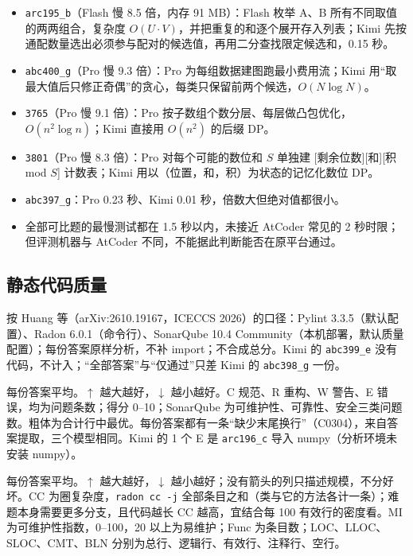 \documentclass[11pt,a4paper,fontset=none]{ctexart}
\begin{document}
\begin{itemize}
  \item \texttt{arc195\_b}（Flash 慢 8.5 倍，内存 91 MB）：Flash 枚举 A、B 所有不同取值的两两组合，复杂度 $O(U\cdot V)$，并把重复的和逐个展开存入列表；Kimi 先按通配数量选出必须参与配对的候选值，再用二分查找限定候选和，0.15 秒。
  \item \texttt{abc400\_g}（Pro 慢 9.3 倍）：Pro 为每组数据建图跑最小费用流；Kimi 用“取最大值后只修正奇偶”的贪心，每类只保留前两个候选，$O(N\log N)$。
  \item \texttt{3765}（Pro 慢 9.1 倍）：Pro 按子数组个数分层、每层做凸包优化，$O(n^2\log n)$；Kimi 直接用 $O(n^2)$ 的后缀 DP。
  \item \texttt{3801}（Pro 慢 8.3 倍）：Pro 对每个可能的数位和 $S$ 单独建 [剩余位数][和][积 mod $S$] 计数表；Kimi 用以（位置，和，积）为状态的记忆化数位 DP。
  \item \texttt{abc397\_g}：Pro 0.23 秒、Kimi 0.01 秒，倍数大但绝对值都很小。
  \item 全部可比题的最慢测试都在 1.5 秒以内，未接近 AtCoder 常见的 2 秒时限；但评测机器与 AtCoder 不同，不能据此判断能否在原平台通过。
\end{itemize}

\subsection{静态代码质量}\label{sec:static}
按 Huang 等（arXiv:2610.19167，ICECCS 2026）的口径：Pylint 3.3.5（默认配置）、Radon 6.0.1（命令行）\ifnum{}、SonarQube 10.4 Community（本机部署，默认质量配置）\fi；每份答案原样分析，不补 import；不合成总分。Kimi 的 \texttt{abc399\_e} 没有代码，不计入；“全部答案”与“仅通过”只差 Kimi 的 \texttt{abc398\_g} 一份。

\begin{center}
\footnotesize
\setlength{\tabcolsep}{3.5pt}
\QualIssueTable
\end{center}
{\footnotesize 每份答案平均。$\uparrow$ 越大越好，$\downarrow$ 越小越好。C 规范、R 重构、W 警告、E 错误，均为问题条数；得分 0--10\ifnum{}；SonarQube 为可维护性、可靠性、安全三类问题数\fi。粗体为合计行中最优。每份答案都有一条“缺少末尾换行”（C0304），来自答案提取，三个模型相同。Kimi 的 1 个 E 是 \texttt{arc196\_c} 导入 numpy（分析环境未安装 numpy）。}

\begin{center}
\footnotesize
\setlength{\tabcolsep}{4pt}
\QualRadonTable
\end{center}
{\footnotesize 每份答案平均。$\uparrow$ 越大越好，$\downarrow$ 越小越好；没有箭头的列只描述规模，不分好坏。CC 为圈复杂度，\texttt{radon cc -j} 全部条目之和（类与它的方法各计一条）；难题本身需要更多分支，且代码越长 CC 越高，宜结合每 100 有效行的密度看。MI 为可维护性指数，0--100，20 以上为易维护；Func 为条目数；LOC、LLOC、SLOC、CMT、BLN 分别为总行、逻辑行、有效行、注释行、空行。}
\end{document}

